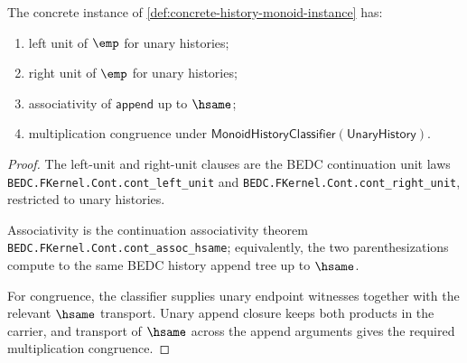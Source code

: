 \begin{theorem}
\label{thm:concrete-history-monoid-laws}
The concrete instance of \autoref{def:concrete-history-monoid-instance} has:
\begin{enumerate}
  \item left unit of $\emp$ for unary histories;
  \item right unit of $\emp$ for unary histories;
  \item associativity of $\mathsf{append}$ up to $\hsame$;
  \item multiplication congruence under
  $\mathsf{MonoidHistoryClassifier}(\mathsf{UnaryHistory})$.
\end{enumerate}
\end{theorem}
\begin{proof}
The left-unit and right-unit clauses are the BEDC continuation unit laws
\texttt{BEDC.FKernel.Cont.cont\_left\_unit} and
\texttt{BEDC.FKernel.Cont.cont\_right\_unit}, restricted to unary histories.

Associativity is the continuation associativity theorem
\texttt{BEDC.FKernel.Cont.cont\_assoc\_hsame}; equivalently, the two
parenthesizations compute to the same BEDC history append tree up to $\hsame$.

For congruence, the classifier supplies unary endpoint witnesses together with
the relevant $\hsame$ transport. Unary append closure keeps both products in the
carrier, and transport of $\hsame$ across the append arguments gives the
required multiplication congruence.
\end{proof}

